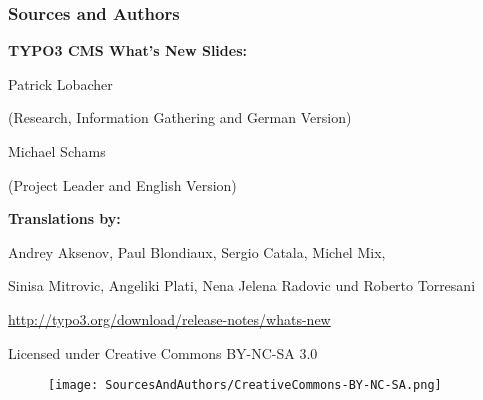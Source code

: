 \begin{frame}[fragile]
	\frametitle{Sources and Authors}

	\vspace{-0.6cm}

	\centerline{\textbf{TYPO3 CMS What's New Slides:}}

	\begin{center}
		\smaller
			\centerline{Patrick Lobacher}
			\centerline{(Research, Information Gathering and German Version)}
			\vspace{0.1cm}
			\centerline{Michael Schams}
			\centerline{(Project Leader and English Version)}
		\normalsize
	\end{center}
	\vspace{-0.6cm}
	\begin{center}
		\smaller
			\centerline{\textbf{Translations by:}}
			\centerline{Andrey Aksenov, Paul Blondiaux, Sergio Catala, Michel Mix,}
			\centerline{Sinisa Mitrovic, Angeliki Plati, Nena Jelena Radovic und Roberto Torresani}
		\normalsize
	\end{center}
	\vspace{-0.6cm}
	\smaller\begin{center}\url{http://typo3.org/download/release-notes/whats-new}\end{center}\normalsize

	\smaller\begin{center}Licensed under Creative Commons BY-NC-SA 3.0\end{center}\normalsize
	\begin{figure}\vspace*{-0.3cm}
		\texttt{[image: SourcesAndAuthors/CreativeCommons-BY-NC-SA.png]}
	\end{figure}

\end{frame}

